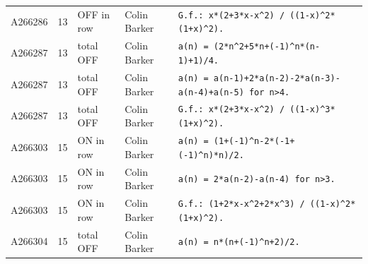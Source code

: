 \documentclass[11pt]{article}
\theoremstyle{definition}
\theoremstyle{remark}
\begin{document}
{\begin{longtable}{p{1.3cm}p{0.7cm}p{2.4cm}p{2.3cm}p{7.3cm}}
A266286 & 13 & OFF in row & Colin Barker & \texttt{G.f.: \allowbreak{}x*\allowbreak{}(2+\allowbreak{}3*\allowbreak{}x-\allowbreak{}x\^{}2)\allowbreak{} \allowbreak{}/\allowbreak{} \allowbreak{}((1-\allowbreak{}x)\allowbreak{}\^{}2*\allowbreak{}(1+\allowbreak{}x)\allowbreak{}\^{}2)\allowbreak{}.} \\
A266287 & 13 & total OFF & Colin Barker & \texttt{a(n)\allowbreak{} \allowbreak{}=\allowbreak{} \allowbreak{}(2*\allowbreak{}n\^{}2+\allowbreak{}5*\allowbreak{}n+\allowbreak{}(-\allowbreak{}1)\allowbreak{}\^{}n*\allowbreak{}(n-\allowbreak{}1)\allowbreak{}+\allowbreak{}1)\allowbreak{}/\allowbreak{}4.} \\
A266287 & 13 & total OFF & Colin Barker & \texttt{a(n)\allowbreak{} \allowbreak{}=\allowbreak{} \allowbreak{}a(n-\allowbreak{}1)\allowbreak{}+\allowbreak{}2*\allowbreak{}a(n-\allowbreak{}2)\allowbreak{}-\allowbreak{}2*\allowbreak{}a(n-\allowbreak{}3)\allowbreak{}-\allowbreak{}a(n-\allowbreak{}4)\allowbreak{}+\allowbreak{}a(n-\allowbreak{}5)\allowbreak{} \allowbreak{}for \allowbreak{}n>4.} \\
A266287 & 13 & total OFF & Colin Barker & \texttt{G.f.: \allowbreak{}x*\allowbreak{}(2+\allowbreak{}3*\allowbreak{}x-\allowbreak{}x\^{}2)\allowbreak{} \allowbreak{}/\allowbreak{} \allowbreak{}((1-\allowbreak{}x)\allowbreak{}\^{}3*\allowbreak{}(1+\allowbreak{}x)\allowbreak{}\^{}2)\allowbreak{}.} \\
A266303 & 15 & ON in row & Colin Barker & \texttt{a(n)\allowbreak{} \allowbreak{}=\allowbreak{} \allowbreak{}(1+\allowbreak{}(-\allowbreak{}1)\allowbreak{}\^{}n-\allowbreak{}2*\allowbreak{}(-\allowbreak{}1+\allowbreak{}(-\allowbreak{}1)\allowbreak{}\^{}n)\allowbreak{}*\allowbreak{}n)\allowbreak{}/\allowbreak{}2.} \\
A266303 & 15 & ON in row & Colin Barker & \texttt{a(n)\allowbreak{} \allowbreak{}=\allowbreak{} \allowbreak{}2*\allowbreak{}a(n-\allowbreak{}2)\allowbreak{}-\allowbreak{}a(n-\allowbreak{}4)\allowbreak{} \allowbreak{}for \allowbreak{}n>3.} \\
A266303 & 15 & ON in row & Colin Barker & \texttt{G.f.: \allowbreak{}(1+\allowbreak{}2*\allowbreak{}x-\allowbreak{}x\^{}2+\allowbreak{}2*\allowbreak{}x\^{}3)\allowbreak{} \allowbreak{}/\allowbreak{} \allowbreak{}((1-\allowbreak{}x)\allowbreak{}\^{}2*\allowbreak{}(1+\allowbreak{}x)\allowbreak{}\^{}2)\allowbreak{}.} \\
A266304 & 15 & total OFF & Colin Barker & \texttt{a(n)\allowbreak{} \allowbreak{}=\allowbreak{} \allowbreak{}n*\allowbreak{}(n+\allowbreak{}(-\allowbreak{}1)\allowbreak{}\^{}n+\allowbreak{}2)\allowbreak{}/\allowbreak{}2.} \\

\end{longtable}}
\end{document}
